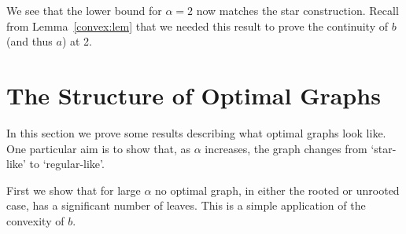 \documentclass[11pt]{article}
\theoremstyle{remark}
\def\a{\alpha}
\begin{document}
We see that the lower bound for $\alpha=2$ now matches the star
construction. Recall from Lemma~\ref{convex:lem} that we needed this
result to prove the continuity of $b$ (and thus $a$) at 2.


\section{The Structure of Optimal Graphs}\label{s:optimal-graphs}

In this section we prove some results describing what optimal graphs
look like. One particular aim is to show that, as $\a$ increases, the
graph changes from `star-like' to `regular-like'.

First we show that for large $\a$ no optimal graph, in either the rooted or unrooted case,
has a significant number of leaves. This is a simple application of the
convexity of $b$.
\end{document}
